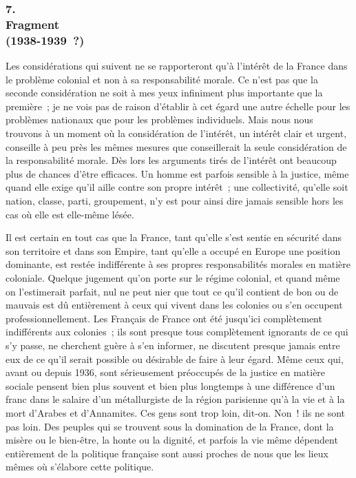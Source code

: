 \documentclass[french,twoside]{book} %
\begin{document}
\subsubsection[{7. Fragment, (1938-1939 ?)}]{7. \\
Fragment \\
(1938-1939 ?)}
\noindent \par
Les considérations qui suivent ne se rapporteront qu'à l'intérêt de la France dans le problème colonial et non à sa responsabilité morale. Ce n'est pas que la seconde considération ne soit à mes yeux infiniment plus importante que la première ; je ne vois pas de raison d'établir à cet égard une autre échelle pour les problèmes nationaux que pour les problèmes individuels. Mais nous nous trouvons à un moment où la considération de l'intérêt, un intérêt clair et urgent, conseille à peu près les mêmes mesures que conseillerait la seule considération de la responsabilité morale. Dès lors les arguments tirés de l'intérêt ont beaucoup plus de chances d'être efficaces. Un homme est parfois sensible à la justice, même quand elle exige qu'il aille contre son propre intérêt ; une collectivité, qu'elle soit nation, classe, parti, groupement, n'y est pour ainsi dire jamais sensible hors les cas où elle est elle-même lésée.\par
Il est certain en tout cas que la France, tant qu'elle s'est sentie en sécurité dans son territoire et dans son Empire, tant qu'elle a occupé en Europe une position dominante, est restée indifférente à ses propres responsabilités mora­les en matière coloniale. Quelque jugement qu'on porte sur le régime colonial, et quand même on l'estimerait parfait, nul ne peut nier que tout ce qu'il contient de bon ou de mauvais est dû entièrement à ceux qui vivent dans les colonies ou s'en occupent professionnellement. Les Français de France ont été jusqu'ici complètement indifférents aux colonies ; ils sont presque tous complètement ignorants de ce qui s'y passe, ne cherchent guère à s'en infor­mer, ne discutent presque jamais entre eux de ce qu'il serait possible ou désirable de faire à leur égard. Même ceux qui, avant ou depuis 1936, sont sérieusement préoccupés de la justice en matière sociale pensent bien plus souvent et bien plus longtemps à une différence d'un franc dans le salaire d'un métallurgiste de la région parisienne qu'à la vie et à la mort d'Arabes et d'Annamites. Ces gens sont trop loin, dit-on. Non ! ils ne sont pas loin. Des peuples qui se trouvent sous la domination de la France, dont la misère ou le bien-être, la honte ou la dignité, et parfois la vie même dépendent entièrement de la politique française sont aussi proches de nous que les lieux mêmes où s'élabore cette politique.\par
\end{document}

